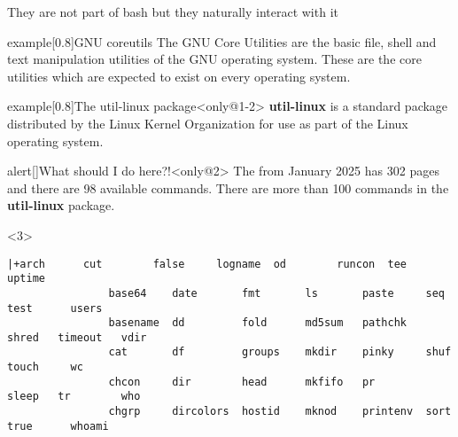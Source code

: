 
\begin{frame}[fragile]{They are not part of bash but they naturally interact with it}
    \vspace{-2mm}
    \begin{varblock}{example}[0.8\textwidth]{GNU coreutils}
        The GNU Core Utilities are the basic file, shell and text manipulation utilities of the GNU operating system.
        These are the core utilities which are expected to exist on every operating system.
    \end{varblock}
    \begin{overlayarea}{\textwidth}{0.6\textheight}
        \begin{varblock}{example}[0.8\textwidth]{The util-linux package}<only@1-2>
            \textbf{util-linux} is a standard package distributed by the Linux Kernel Organization for use as part of the Linux operating system.
        \end{varblock}
        \PrepareURLsymbol[PB]
        \begin{varblock}{alert}[\textwidth]{What should I do here?!}<only@2>
            The  from January 2025 has \alert{302 pages} and there are \alert{98 available commands}.
            There are more than \alert{100 commands} in the \textbf{util-linux} package.
        \end{varblock}
        \begin{onlyenv}<3>
            \begin{lstlisting}[style=myBash, style=smaller, numbers=none, aboveskip=3mm]
                |+arch      cut        false     logname  od        runcon  tee       uptime
                base64    date       fmt       ls       paste     seq     test      users
                basename  dd         fold      md5sum   pathchk   shred   timeout   vdir
                cat       df         groups    mkdir    pinky     shuf    touch     wc
                chcon     dir        head      mkfifo   pr        sleep   tr        who
                chgrp     dircolors  hostid    mknod    printenv  sort    true      whoami

\end{lstlisting}
\end{onlyenv}
\end{overlayarea}
\end{frame}
